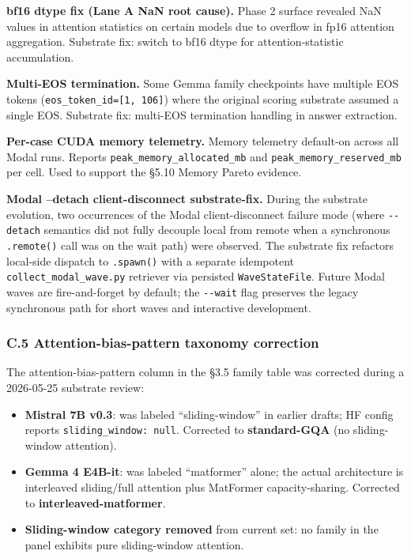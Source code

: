 \documentclass[
]{article}
\providecommand{\tightlist}{%
  \setlength{\itemsep}{0pt}\setlength{\parskip}{0pt}}
\begin{document}
\textbf{bf16 dtype fix (Lane A NaN root cause).} Phase 2 surface
revealed NaN values in attention statistics on certain models due to
overflow in fp16 attention aggregation. Substrate fix: switch to bf16
dtype for attention-statistic accumulation.

\textbf{Multi-EOS termination.} Some Gemma family checkpoints have
multiple EOS tokens (\texttt{eos\_token\_id=[1,\ 106]}) where the
original scoring substrate assumed a single EOS. Substrate fix:
multi-EOS termination handling in answer extraction.

\textbf{Per-case CUDA memory telemetry.} Memory telemetry default-on
across all Modal runs. Reports \texttt{peak\_memory\_allocated\_mb} and
\texttt{peak\_memory\_reserved\_mb} per cell. Used to support the \S5.10
Memory Pareto evidence.

\textbf{Modal --detach client-disconnect substrate-fix.} During the
substrate evolution, two occurrences of the Modal client-disconnect
failure mode (where \texttt{-\/-detach} semantics did not fully decouple
local from remote when a synchronous \texttt{.remote()} call was on the
wait path) were observed. The substrate fix refactors local-side
dispatch to \texttt{.spawn()} with a separate idempotent
\texttt{collect\_modal\_wave.py} retriever via persisted
\texttt{WaveStateFile}. Future Modal waves are fire-and-forget by
default; the \texttt{-\/-wait} flag preserves the legacy synchronous
path for short waves and interactive development.

\subsubsection{C.5 Attention-bias-pattern taxonomy
correction}\label{c-5-attention-bias-pattern-taxonomy-correction}

The attention-bias-pattern column in the \S3.5 family table was
corrected during a 2026-05-25 substrate review:

\begin{itemize}
\tightlist
\item
  \textbf{Mistral 7B v0.3}: was labeled ``sliding-window'' in earlier
  drafts; HF config reports \texttt{sliding\_window:\ null}. Corrected
  to \textbf{standard-GQA} (no sliding-window attention).
\item
  \textbf{Gemma 4 E4B-it}: was labeled ``matformer'' alone; the actual
  architecture is interleaved sliding/full attention plus MatFormer
  capacity-sharing. Corrected to \textbf{interleaved-matformer}.
\item
  \textbf{Sliding-window category removed} from current set: no family
  in the panel exhibits pure sliding-window attention.
\end{itemize}
\end{document}
